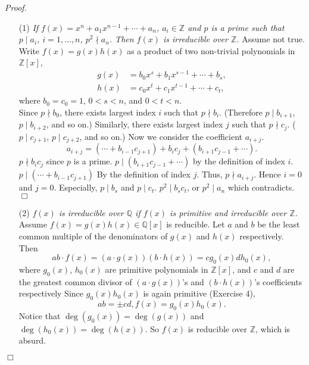 \documentclass{article}
\begin{document}
\emph{Proof.}
\begin{enumerate}
\item[(1)]
\emph{If $f(x) = x^n + a_1 x^{n-1} + \cdots + a_n$, $a_i \in \mathbb{Z}$
and $p$ is a prime such that $p \mid a_i$, $i = 1, ..., n$, $p^2 \nmid a_n$.
Then $f(x)$ is irreducible over $\mathbb{Z}$.}
Assume not true.
Write $f(x) = g(x)h(x)$ as a product of two non-trivial polynomials in $\mathbb{Z}[x]$,
\begin{align*}
g(x) &= b_0 x^s + b_1 x^{s-1} + \cdots + b_s, \\
h(x) &= c_0 x^t + c_1 x^{t-1} + \cdots + c_t,
\end{align*}
where $b_0 = c_0 = 1$, $0 < s < n$, and $0 < t < n$. \\

Since $p \nmid b_0$, there exists largest index $i$ such that $p \nmid b_i$.
(Therefore $p \mid b_{i+1}$, $p \mid b_{i+2}$, and so on.)
Similarly, there exists largest index $j$ such that $p \nmid c_j$.
($p \mid c_{j+1}$, $p \mid c_{j+2}$, and so on.)
Now we consider the coefficient $a_{i+j}$.
$$a_{i+j} = (\cdots + b_{i-1} c_{j+1}) + b_i c_j + (b_{i+1} c_{j-1} + \cdots).$$
$p \nmid b_i c_j$ since $p$ is a prime.
$p \mid (b_{i+1} c_{j-1} + \cdots)$ by the definition of index $i$.
$p \mid (\cdots + b_{i-1} c_{j+1})$ By the definition of index $j$.
Thus, $p \nmid a_{i+j}$.
Hence $i = 0$ and $j = 0$. Especially, $p \mid b_s$ and $p \mid c_t$.
$p^2 \mid b_s c_t$, or $p^2 \mid a_n$ which contradicts.
$\Box$
\item[(2)]
\emph{$f(x)$ is irreducible over $\mathbb{Q}$
if $f(x)$ is primitive and irreducible over $\mathbb{Z}$.}
Assume $f(x) = g(x)h(x) \in \mathbb{Q}[x]$ is reducible.
Let $a$ and $b$ be the least common multiple of the denominators of
$g(x)$ and $h(x)$ respectively.
Then
$$ab \cdot f(x) = (a \cdot g(x))(b \cdot h(x)) = c g_0(x) d h_0(x),$$
where $g_0(x)$, $h_0(x)$ are primitive polynomials in $\mathbb{Z}[x]$, and
$c$ and $d$ are the greatest common divisor of
$(a \cdot g(x))$'s and $(b \cdot h(x))$'s coefficients respectively
Since $g_0(x) h_0(x)$ is again primitive (Exercise 4),
$$ab = \pm cd, f(x) = g_0(x) h_0(x).$$
Notice that $\deg(g_0(x)) = \deg(g(x))$ and $\deg(h_0(x)) = \deg(h(x))$.
So $f(x)$ is reducible over $\mathbb{Z}$, which is absurd.
\end{enumerate}
$\Box$ \\\\
\end{document}
